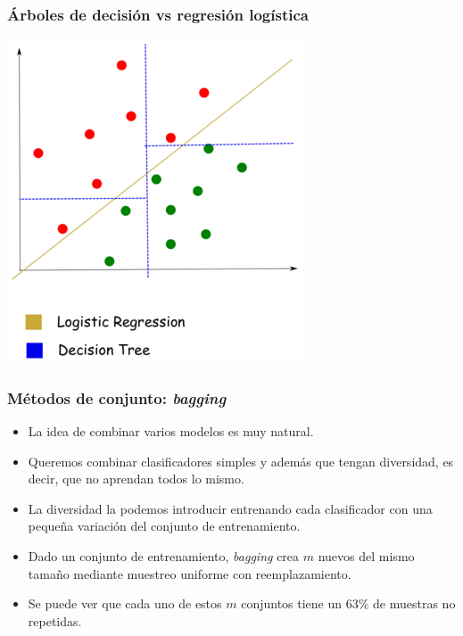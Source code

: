 \documentclass{beamer}
\begin{document}
\begin{frame}
\frametitle{Árboles de decisión vs regresión logística}
\centering
\includegraphics[height=0.8\textheight]{arbol_logreg.png}
\end{frame}

\begin{frame}
\frametitle{Métodos de conjunto: \textit{bagging}}

\begin{itemize}
\item La idea de combinar varios modelos es muy natural.
\item Queremos combinar clasificadores simples y además que tengan diversidad, es decir, que no aprendan todos lo mismo.
\item La diversidad la podemos introducir entrenando cada clasificador con una pequeña variación del conjunto de entrenamiento.
\item Dado un conjunto de entrenamiento, \textit{bagging} crea $m$ nuevos del mismo tamaño mediante muestreo uniforme con reemplazamiento.
\item Se puede ver que cada uno de estos $m$ conjuntos tiene un 63\% de muestras no repetidas.
\end{itemize}
\end{frame}
\end{document}
